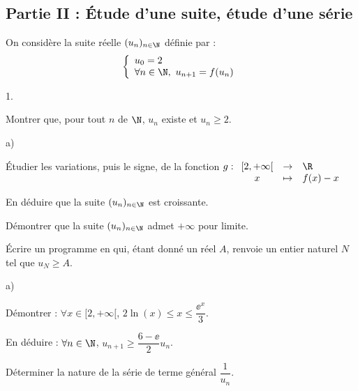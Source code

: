 \documentclass[11pt]{article}%
\begin{document}
\subsection*{Partie II : Étude d'une suite, étude d'une série}
\noindent
On considère la suite réelle $(u_n)_{n\in\N}$ définie par :
\[
\left\{
  \begin{array}{l}
    u_0=2\\
    \forall n \in\N, \ u_{n+1}=f(u_n)
  \end{array}
\right.
\]
\begin{noliste}{1.}
  \setlength{\itemsep}{2mm}
  \setcounter{enumi}{4}
\item Montrer que, pour tout $n$ de $\N$, $u_n$ existe et $u_n\geq 2$.
  
  
  
\item 
  \begin{noliste}{a)}
  \item Étudier les variations, puis le signe, de la fonction $g:
    \begin{array}[t]{ccl}
      [2,+\infty[ & \rightarrow & \R\\
      x& \mapsto & f(x)-x
    \end{array}$
    
    
    
  \item En déduire que la suite $(u_n)_{n\in\N}$ est croissante.
	
    
  \end{noliste}
  
  
\item Démontrer que la suite $(u_n)_{n\in\N}$ admet $+\infty$ pour 
  limite.
  
  

\item Écrire un programme en \Scilab{} qui, étant donné un réel $A$,
  renvoie un entier naturel $N$ tel que $u_N\geq A$.




\item 
  \begin{noliste}{a)}
  \item Démontrer : $\forall x\in[2,+\infty[$, $2\ln(x)\leq x \leq
    \dfrac{\ee^x}{3}$.
    
    
    
  \item En déduire : $\forall n\in\N$, $u_{n+1} \geq
    \dfrac{6-\ee}{2}u_n$.
	
    
    

	

  \item Déterminer la nature de la série de terme général
    $\dfrac{1}{u_n}$.
	
    
\end{noliste}
\end{noliste}
\end{document}
